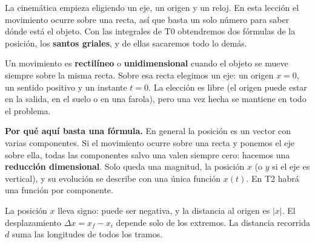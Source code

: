 \documentclass[11pt,a4paper]{article}
\begin{document}
\shorthandoff{<>}
\color{Ink}
La cinem\'atica empieza eligiendo un eje, un origen y un reloj. En esta lecci\'on el
movimiento ocurre sobre una recta, as\'i que basta un solo n\'umero para saber d\'onde est\'a
el objeto. Con las integrales de T0 obtendremos dos f\'ormulas de la posici\'on, los
\textbf{santos griales}, y de ellas sacaremos todo lo dem\'as.
\begin{lessonindex}
\end{lessonindex}
\precisionnote

Un movimiento es \textbf{rectil\'ineo} o \textbf{unidimensional} cuando el objeto se mueve
siempre sobre la misma recta. Sobre esa recta elegimos un eje: un origen $x=0$, un sentido
positivo y un instante $t=0$. La elecci\'on es libre (el origen puede estar en la salida,
en el suelo o en una farola), pero una vez hecha se mantiene en todo el problema.

\begin{keybox}
\textbf{Por qu\'e aqu\'i basta una f\'ormula.} En general la posici\'on es un vector con
varias componentes. Si el movimiento ocurre sobre una recta y ponemos el eje sobre ella,
todas las componentes salvo una valen siempre cero: hacemos una \textbf{reducci\'on
dimensional}. Solo queda una magnitud, la posici\'on $x$ (o $y$ si el eje es vertical), y su
evoluci\'on se describe con una \'unica funci\'on $x(t)$. En T2 habr\'a una funci\'on por componente.
\end{keybox}

La posici\'on $x$ lleva signo: puede ser negativa, y la distancia al origen es $|x|$.
El desplazamiento $\Delta x=x_f-x_i$ depende solo de los extremos.
La distancia recorrida $d$ suma las longitudes de todos los tramos.
\end{document}
